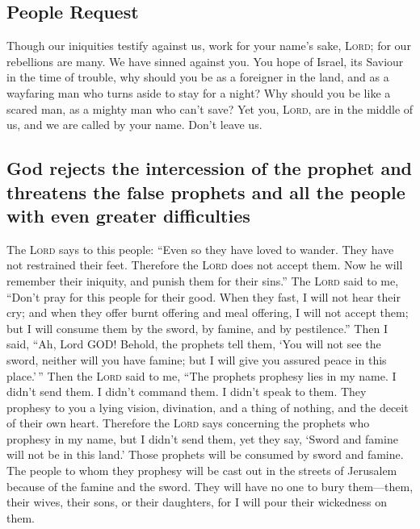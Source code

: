 \hypertarget{people-request}{%
\subsection{People Request}\label{people-request}}

 Though our iniquities testify against us, work for your
name's sake, \textsc{Lord}; for our rebellions are many. We have sinned
against you.  You hope of Israel, its Saviour in the time
of trouble, why should you be as a foreigner in the land, and as a
wayfaring man who turns aside to stay for a night?  Why
should you be like a scared man, as a mighty man who can't save? Yet
you, \textsc{Lord}, are in the middle of us, and we are called by your
name. Don't leave us.

\hypertarget{god-rejects-the-intercession-of-the-prophet-and-threatens-the-false-prophets-and-all-the-people-with-even-greater-difficulties}{%
\subsection{God rejects the intercession of the prophet and threatens
the false prophets and all the people with even greater
difficulties}\label{god-rejects-the-intercession-of-the-prophet-and-threatens-the-false-prophets-and-all-the-people-with-even-greater-difficulties}}

 The \textsc{Lord} says to this people: ``Even so they
have loved to wander. They have not restrained their feet. Therefore the
\textsc{Lord} does not accept them. Now he will remember their iniquity,
and punish them for their sins.''  The \textsc{Lord} said
to me, ``Don't pray for this people for their good.  When
they fast, I will not hear their cry; and when they offer burnt offering
and meal offering, I will not accept them; but I will consume them by
the sword, by famine, and by pestilence.''  Then I said,
``Ah, Lord GOD! Behold, the prophets tell them, `You will not see the
sword, neither will you have famine; but I will give you assured peace
in this place.'\,''  Then the \textsc{Lord} said to me,
``The prophets prophesy lies in my name. I didn't send them. I didn't
command them. I didn't speak to them. They prophesy to you a lying
vision, divination, and a thing of nothing, and the deceit of their own
heart.  Therefore the \textsc{Lord} says concerning the
prophets who prophesy in my name, but I didn't send them, yet they say,
`Sword and famine will not be in this land.' Those prophets will be
consumed by sword and famine.  The people to whom they
prophesy will be cast out in the streets of Jerusalem because of the
famine and the sword. They will have no one to bury them---them, their
wives, their sons, or their daughters, for I will pour their wickedness
on them.

